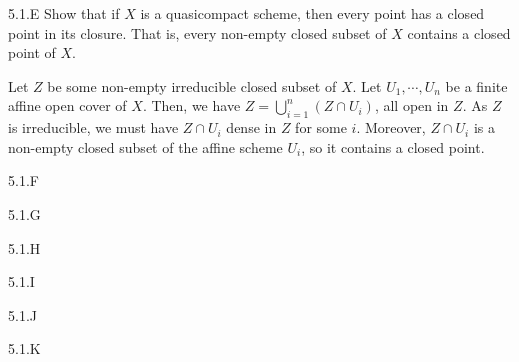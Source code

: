 \begin{exercise}{5.1.E}
    Show that if $X$ is a quasicompact scheme, then every point has a closed point in its closure. That is, every non-empty closed subset of $X$ contains a closed point of $X$.
\end{exercise}
\begin{solution}
    Let $Z$ be some non-empty irreducible closed subset of $X$. Let $U_1, \cdots, U_n$ be a finite affine open cover of $X$. Then, we have $Z = \bigcup_{i = 1}^n (Z \cap U_i)$, all open in $Z$. As $Z$ is irreducible, we must have $Z \cap U_i$ dense in $Z$ for some $i$. Moreover, $Z \cap U_i$ is a non-empty closed subset of the affine scheme $U_i$, so it contains a closed point.  
\end{solution}

\begin{exercise}{5.1.F}

\end{exercise}
\begin{solution}
    \todo{}
\end{solution}

\begin{exercise}{5.1.G}

\end{exercise}
\begin{solution}
    \todo{}
\end{solution}


\begin{exercise}{5.1.H}

\end{exercise}
\begin{solution}
    \todo{}
\end{solution}

\begin{exercise}{5.1.I}

\end{exercise}
\begin{solution}
    \todo{}
\end{solution}


\begin{exercise}{5.1.J}

\end{exercise}
\begin{solution}
    \todo{}
\end{solution}

\begin{exercise}{5.1.K}

\end{exercise}
\begin{solution}
    \todo{}
\end{solution} 


